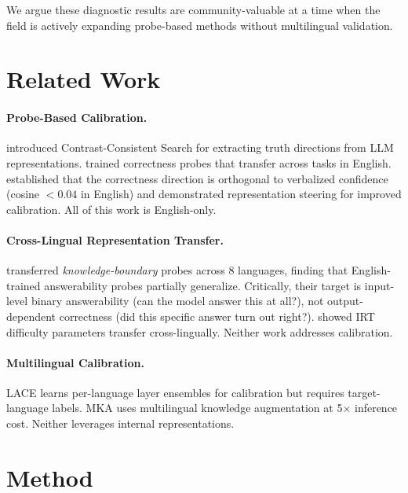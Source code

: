 \documentclass[11pt,a4paper]{article}
\begin{document}
We argue these diagnostic results are community-valuable at a time when the field is actively expanding probe-based methods without multilingual validation.

\section{Related Work}

\paragraph{Probe-Based Calibration.}
\citet{burns2023discovering} introduced Contrast-Consistent Search for extracting truth directions from LLM representations.
\citet{miao-etal-2024-coral} trained correctness probes that transfer across tasks in English.
\citet{miao-ungar-2026} established that the correctness direction is orthogonal to verbalized confidence (cosine $< 0.04$ in English) and demonstrated representation steering for improved calibration.
All of this work is English-only.

\paragraph{Cross-Lingual Representation Transfer.}
\citet{xiao-etal-2025} transferred \emph{knowledge-boundary} probes across 8 languages, finding that English-trained answerability probes partially generalize.
Critically, their target is input-level binary answerability (can the model answer this at all?), not output-dependent correctness (did this specific answer turn out right?).
\citet{civelli2024} showed IRT difficulty parameters transfer cross-lingually.
Neither work addresses calibration.

\paragraph{Multilingual Calibration.}
LACE \citep{zhou-etal-2024-lace} learns per-language layer ensembles for calibration but requires target-language labels.
MKA \citep{huang-etal-2024-mka} uses multilingual knowledge augmentation at 5$\times$ inference cost.
Neither leverages internal representations.

\section{Method}
\end{document}
